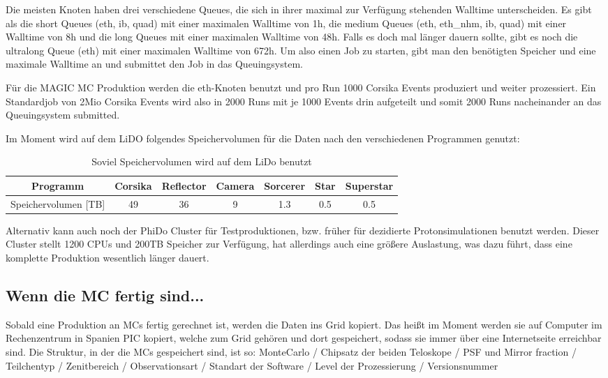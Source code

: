 Die meisten Knoten haben drei verschiedene Queues, die sich in ihrer maximal zur Verfügung stehenden Walltime unterscheiden.
Es gibt als die short Queues (eth, ib, quad) mit einer maximalen Walltime von 1h, die medium Queues (eth, eth\_nhm, ib, quad) mit einer Walltime von 8h und die long Queues mit einer maximalen Walltime von 48h. 
Falls es doch mal länger dauern sollte, gibt es noch die ultralong Queue (eth) mit einer maximalen Walltime von 672h.
Um also einen Job zu starten, gibt man den benötigten Speicher und eine maximale Walltime an und submittet den Job in das Queuingsystem.

Für die MAGIC MC Produktion werden die eth-Knoten benutzt und pro Run 1000 Corsika Events produziert und weiter prozessiert. 
Ein Standardjob von 2Mio Corsika Events wird also in 2000 Runs mit je 1000 Events drin aufgeteilt und somit 2000 Runs nacheinander an das Queuingsystem submitted.


Im Moment wird auf dem LiDO folgendes Speichervolumen für die Daten nach den verschiedenen Programmen genutzt:

\begin{table}[h!]
    \centering
    \caption{Soviel Speichervolumen wird auf dem LiDo benutzt}
    \label{tab:bsp}
    \begin{tabular}{ccccccc}
        \toprule
        Programm & Corsika & Reflector & Camera & Sorcerer & Star & Superstar\\
        \midrule
        Speichervolumen [TB] & 49 & 36 & 9 & 1.3 & 0.5 & 0.5\\
        \bottomrule
    \end{tabular}
\end{table}

Alternativ kann auch noch der PhiDo Cluster für Testproduktionen, bzw. früher für dezidierte Protonsimulationen benutzt werden. 
Dieser Cluster stellt 1200 CPUs und 200TB Speicher zur Verfügung, hat allerdings auch eine größere Auslastung, was dazu führt, dass eine komplette Produktion wesentlich länger dauert.



\subsection{Wenn die MC fertig sind...}
Sobald eine Produktion an MCs fertig gerechnet ist, werden die Daten ins Grid kopiert.
Das heißt im Moment werden sie auf Computer im Rechenzentrum in Spanien PIC kopiert, welche zum Grid gehören und dort gespeichert, sodass sie immer über eine Internetseite erreichbar sind.
Die Struktur, in der die MCs gespeichert sind, ist so: 
MonteCarlo / Chipsatz der beiden Teloskope / PSF und Mirror fraction / Teilchentyp / Zenitbereich / Observationsart / Standart der Software / Level der Prozessierung / Versionsnummer \newline

